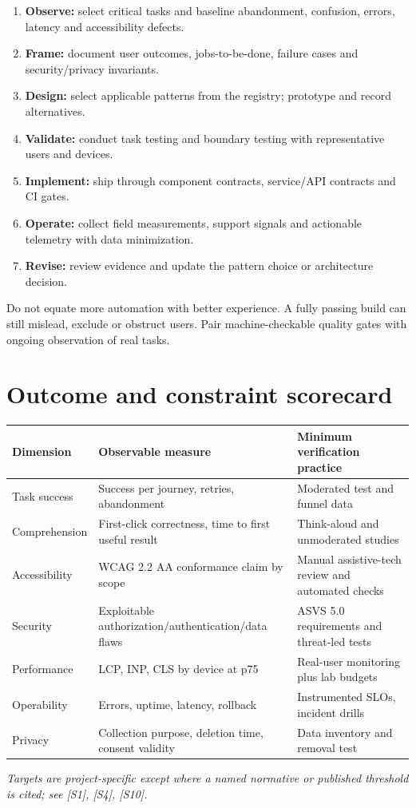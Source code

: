 \documentclass[11pt]{article}
\begin{document}
\begin{enumerate}
\item \textbf{Observe:} select critical tasks and baseline abandonment, confusion, errors, latency and accessibility defects.
\item \textbf{Frame:} document user outcomes, jobs-to-be-done, failure cases and security/privacy invariants.
\item \textbf{Design:} select applicable patterns from the registry; prototype and record alternatives.
\item \textbf{Validate:} conduct task testing and boundary testing with representative users and devices.
\item \textbf{Implement:} ship through component contracts, service/API contracts and CI gates.
\item \textbf{Operate:} collect field measurements, support signals and actionable telemetry with data minimization.
\item \textbf{Revise:} review evidence and update the pattern choice or architecture decision.
\end{enumerate}
\begin{decisionbox}
Do not equate more automation with better experience. A fully passing build can still mislead, exclude or obstruct users. Pair machine-checkable quality gates with ongoing observation of real tasks.
\end{decisionbox}

\section{Outcome and constraint scorecard}

\begin{tabularx}{\linewidth}{@{}>{\raggedright\arraybackslash}p{32mm}>{\raggedright\arraybackslash}X >{\raggedright\arraybackslash}X@{}}\toprule
Dimension & Observable measure & Minimum verification practice \\\midrule
Task success & Success per journey, retries, abandonment & Moderated test and funnel data \\
Comprehension & First-click correctness, time to first useful result & Think-aloud and unmoderated studies \\
Accessibility & WCAG 2.2 AA conformance claim by scope & Manual assistive-tech review and automated checks \\
Security & Exploitable authorization/authentication/data flaws & ASVS 5.0 requirements and threat-led tests \\
Performance & LCP, INP, CLS by device at p75 & Real-user monitoring plus lab budgets \\
Operability & Errors, uptime, latency, rollback & Instrumented SLOs, incident drills \\
Privacy & Collection purpose, deletion time, consent validity & Data inventory and removal test \\
\bottomrule\end{tabularx}
\textit{Targets are project-specific except where a named normative or published threshold is cited; see [S1], [S4], [S10].}
\end{document}

